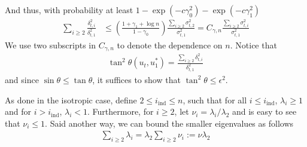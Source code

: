 \documentclass[10pt]{article}
\newcommand{\ind}{\mathrm{ind}}
\begin{document}
And thus, with probability at least $ 1 - \exp(-c \gamma_0^2) - \exp(-c {\gamma}_1^2)$ %
\begin{align*}
\sum_{i \geq 2}\frac{\delta_{t,i}^2}{\delta_{t,1}^2} &\leq  \left(\frac{1 + \gamma_1 + \log n}{1 - \gamma_0}\right) \frac{\sum_{i\geq 2} \sigma_{t,2}^2}{\sigma_{t,1}^2} = C_{\gamma,n} \frac{\sum_{i\geq 2} \sigma_{t,i}^2}{\sigma_{t,1}^2}
\end{align*}
We use two subscripts in $C_{\gamma,n}$ to denote the dependence on $n$.
Notice that
\begin{align*}
\tan^2\theta(u_t, u_1^*) = \frac{\sum_{i\geq 2}  \delta_{t,i}^2}{\delta_{t,1}^2}
\end{align*}
and since $\sin\theta \leq \tan \theta$, it suffices to show that $\tan^2\theta \leq \epsilon^2$.

As done in the isotropic case, define $2 \leq i_\ind \leq n$, such that for all $i \leq i_\ind$, $\lambda_i \geq 1$ and for $i > i_\ind$, $\lambda_i < 1$. Furthermore, for $i \geq 2$, let $\nu_i = \lambda_i / \lambda_2$ and is easy to see that $\nu_i \leq 1$. Said another way, we can bound the smaller eigenvalues as follows
\begin{align*}
\sum_{i \geq 2} \lambda_i = \lambda_2 \sum_{i\geq 2} \nu_i  := \nu \lambda_2
\end{align*}
\end{document}
